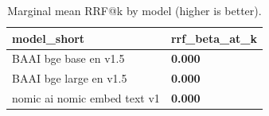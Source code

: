 \begin{table}[t]
\centering
\small
\begin{tabular}{l l}
\toprule
model_short & rrf_beta_at_k \\
\midrule
BAAI bge base en v1.5 & \textbf{0.000} \\
BAAI bge large en v1.5 & \textbf{0.000} \\
nomic ai nomic embed text v1 & \textbf{0.000} \\
\bottomrule
\end{tabular}
\caption{Marginal mean RRF@k by model (higher is better).}
\label{tab:marginal_model_rrf_beta_at_k}
\end{table}